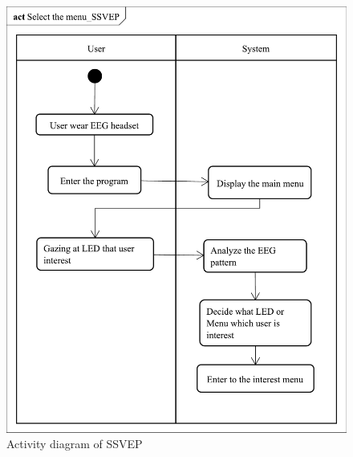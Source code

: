 \begin{figure}[ht]
\centering \includegraphics[scale=0.295]{chapter4/av_SSVEP.pdf}
\caption{Activity diagram of SSVEP}
\end{figure}


